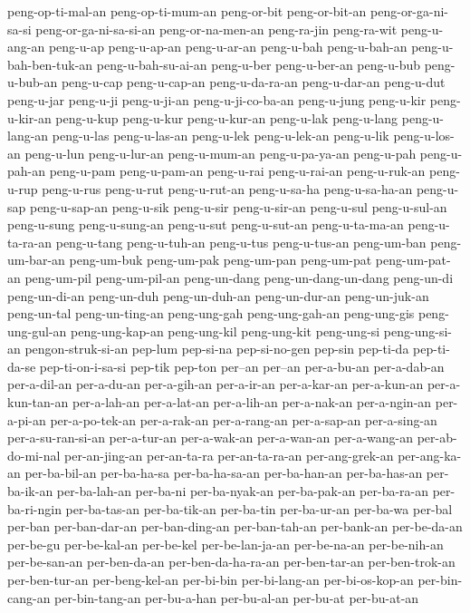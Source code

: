 {peng-op-ti-mal-an peng-op-ti-mum-an peng-or-bit peng-or-bit-an
peng-or-ga-ni-sa-si peng-or-ga-ni-sa-si-an peng-or-na-men-an peng-ra-jin
peng-ra-wit peng-u-ang-an peng-u-ap peng-u-ap-an peng-u-ar-an peng-u-bah
peng-u-bah-an peng-u-bah-ben-tuk-an peng-u-bah-su-ai-an peng-u-ber
peng-u-ber-an peng-u-bub peng-u-bub-an peng-u-cap peng-u-cap-an
peng-u-da-ra-an peng-u-dar-an peng-u-dut peng-u-jar peng-u-ji peng-u-ji-an
peng-u-ji-co-ba-an peng-u-jung peng-u-kir peng-u-kir-an peng-u-kup
peng-u-kur peng-u-kur-an peng-u-lak peng-u-lang peng-u-lang-an peng-u-las
peng-u-las-an peng-u-lek peng-u-lek-an peng-u-lik peng-u-los-an peng-u-lun
peng-u-lur-an peng-u-mum-an peng-u-pa-ya-an peng-u-pah peng-u-pah-an
peng-u-pam peng-u-pam-an peng-u-rai peng-u-rai-an peng-u-ruk-an peng-u-rup
peng-u-rus peng-u-rut peng-u-rut-an peng-u-sa-ha peng-u-sa-ha-an
peng-u-sap peng-u-sap-an peng-u-sik peng-u-sir peng-u-sir-an peng-u-sul
peng-u-sul-an peng-u-sung peng-u-sung-an peng-u-sut peng-u-sut-an
peng-u-ta-ma-an peng-u-ta-ra-an peng-u-tang peng-u-tuh-an peng-u-tus
peng-u-tus-an peng-um-ban peng-um-bar-an peng-um-buk peng-um-pak
peng-um-pan peng-um-pat peng-um-pat-an peng-um-pil peng-um-pil-an
peng-un-dang peng-un-dang-un-dang peng-un-di peng-un-di-an peng-un-duh
peng-un-duh-an peng-un-dur-an peng-un-juk-an peng-un-tal peng-un-ting-an
peng-ung-gah peng-ung-gah-an peng-ung-gis peng-ung-gul-an peng-ung-kap-an
peng-ung-kil peng-ung-kit peng-ung-si peng-ung-si-an pengon-struk-si-an
pep-lum pep-si-na pep-si-no-gen pep-sin pep-ti-da pep-ti-da-se
pep-ti-on-i-sa-si pep-tik pep-ton per--an per--an per-a-bu-an per-a-dab-an
per-a-dil-an per-a-du-an per-a-gih-an per-a-ir-an per-a-kar-an
per-a-kun-an per-a-kun-tan-an per-a-lah-an per-a-lat-an per-a-lih-an
per-a-nak-an per-a-ngin-an per-a-pi-an per-a-po-tek-an per-a-rak-an
per-a-rang-an per-a-sap-an per-a-sing-an per-a-su-ran-si-an per-a-tur-an
per-a-wak-an per-a-wan-an per-a-wang-an per-ab-do-mi-nal per-an-jing-an
per-an-ta-ra per-an-ta-ra-an per-ang-grek-an per-ang-ka-an per-ba-bil-an
per-ba-ha-sa per-ba-ha-sa-an per-ba-han-an per-ba-has-an per-ba-ik-an
per-ba-lah-an per-ba-ni per-ba-nyak-an per-ba-pak-an per-ba-ra-an
per-ba-ri-ngin per-ba-tas-an per-ba-tik-an per-ba-tin per-ba-ur-an
per-ba-wa per-bal per-ban per-ban-dar-an per-ban-ding-an per-ban-tah-an
per-bank-an per-be-da-an per-be-gu per-be-kal-an per-be-kel
per-be-lan-ja-an per-be-na-an per-be-nih-an per-be-san-an per-ben-da-an
per-ben-da-ha-ra-an per-ben-tar-an per-ben-trok-an per-ben-tur-an
per-beng-kel-an per-bi-bin per-bi-lang-an per-bi-os-kop-an per-bin-cang-an
per-bin-tang-an per-bu-a-han per-bu-al-an per-bu-at per-bu-at-an
}
